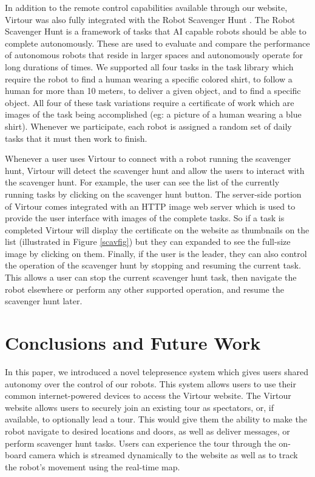 \documentclass[
  oneside,
  11pt, a4paper,
  footinclude=true,
  headinclude=true,
  cleardoublepage=empty
]{article}
\begin{document}
In addition to the remote control capabilities available through our website,
Virtour was also fully integrated with the Robot Scavenger Hunt
\cite{zhang2016}.  The Robot Scavenger Hunt is a framework of tasks that AI
capable robots should be able to complete autonomously. These are used to
evaluate and compare the performance of autonomous robots that reside in larger
spaces and autonomously operate for long durations of times. We supported all
four tasks in the task library which require the robot to find a human wearing
a specific colored shirt, to follow a human for more than 10 meters, to deliver
a given object, and to find a specific object. All four of these task
variations require a certificate of work which are images of the task being
accomplished (eg: a picture of a human wearing a blue shirt). Whenever we
participate, each robot is assigned a random set of daily tasks that it must
then work to finish.

Whenever a user uses Virtour to connect with a robot running the scavenger
hunt, Virtour will detect the scavenger hunt and allow the users to interact
with the scavenger hunt. For example, the user can see the list of the
currently running tasks by clicking on the scavenger hunt button. The
server-side portion of Virtour comes integrated with an HTTP image web server
which is used to provide the user interface with images of the complete tasks.
So if a task is completed Virtour will display the certificate on the website
as thumbnails on the list (illustrated in Figure \ref{scavfig}) but they can
expanded to see the full-size image by clicking on them. Finally, if the user
is the leader, they can also control the operation of the scavenger hunt by
stopping and resuming the current task. This allows a user can stop the current
scavenger hunt task, then navigate the robot elsewhere or perform any other
supported operation, and resume the scavenger hunt later.

\section{Conclusions and Future Work}

In this paper, we introduced a novel telepresence system which gives users
shared autonomy over the control of our robots. This system allows users to use
their common internet-powered devices to access the Virtour website. The
Virtour website allows users to securely join an existing tour as spectators,
or, if available, to optionally lead a tour. This would give them the ability
to make the robot navigate to desired locations and doors, as well as deliver
messages, or perform scavenger hunt tasks. Users can experience the tour
through the on-board camera which is streamed dynamically to the website as
well as to track the robot's movement using the real-time map.
\end{document}
